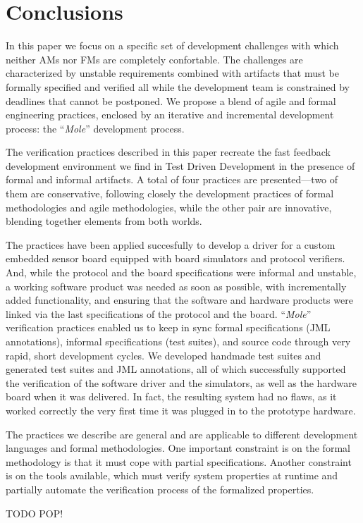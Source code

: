 \documentclass[english]{lni}
\newcommand{\mole}{``\emph{Mole}''\xspace}
\begin{document}
\section{Conclusions}
\label{sec:conclusions}

In this paper we focus on a specific set of development challenges
with which neither AMs nor FMs are completely confortable.  The
challenges are characterized by unstable requirements combined with
artifacts that must be formally specified and verified all while the
development team is constrained by deadlines that cannot be postponed.
We propose a blend of agile and formal engineering practices, enclosed
by an iterative and incremental development process: the \mole
development process.

The verification practices described in this paper recreate the fast
feedback development environment we find in Test Driven Development in
the presence of formal and informal artifacts.  A total of four
practices are presented---two of them are conservative, following
closely the development practices of formal methodologies and agile
methodologies, while the other pair are innovative, blending together
elements from both worlds.

The practices have been applied succesfully to develop a driver for a
custom embedded sensor board equipped with board simulators and
protocol verifiers.  And, while the protocol and the board
specifications were informal and unstable, a working software product
was needed as soon as possible, with incrementally added
functionality, and ensuring that the software and hardware products
were linked via the last specifications of the protocol and the board.
\mole verification practices enabled us to keep in sync formal
specifications (JML annotations), informal specifications (test
suites), and source code through very rapid, short development cycles.
We developed handmade test suites and generated test suites and JML
annotations, all of which successfully supported the verification of
the software driver and the simulators, as well as the hardware board
when it was delivered.  In fact, the resulting system had no flaws, as
it worked correctly the very first time it was plugged in to the
prototype hardware.

The practices we describe are general and are applicable to different
development languages and formal methodologies.  One important
constraint is on the formal methodology is that it must cope with
partial specifications.  Another constraint is on the tools available,
which must verify system properties at runtime and partially automate
the verification process of the formalized properties.

TODO POP!

%


\end{document}
